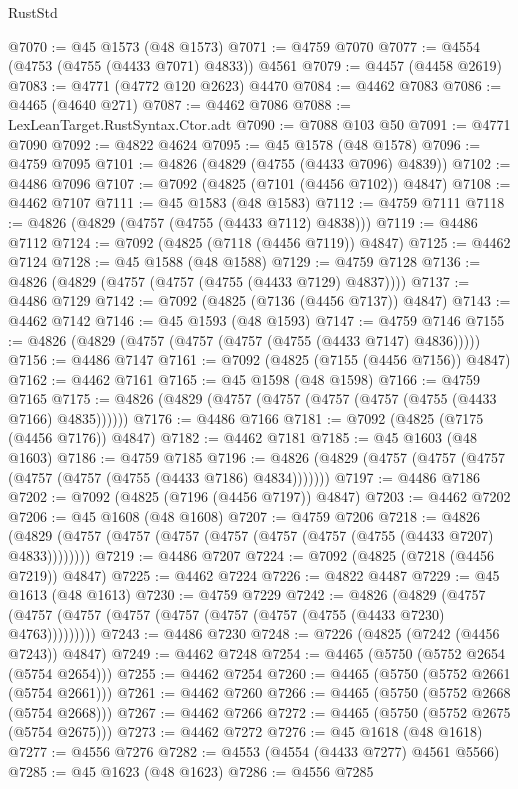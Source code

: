 \begin{lexlean}{RustStd}
\begin{coremodule}
@7070 := @45 @1573 (@48 @1573)
@7071 := @4759 @7070
@7077 := @4554 (@4753 (@4755 (@4433 @7071) @4833)) @4561
@7079 := @4457 (@4458 @2619)
@7083 := @4771 (@4772 @120 @2623) @4470
@7084 := @4462 @7083
@7086 := @4465 (@4640 @271)
@7087 := @4462 @7086
@7088 := LexLeanTarget.RustSyntax.Ctor.adt
@7090 := @7088 @103 @50
@7091 := @4771 @7090
@7092 := @4822 @4624
@7095 := @45 @1578 (@48 @1578)
@7096 := @4759 @7095
@7101 := @4826 (@4829 (@4755 (@4433 @7096) @4839))
@7102 := @4486 @7096
@7107 := @7092 (@4825 (@7101 (@4456 @7102)) @4847)
@7108 := @4462 @7107
@7111 := @45 @1583 (@48 @1583)
@7112 := @4759 @7111
@7118 := @4826 (@4829 (@4757 (@4755 (@4433 @7112) @4838)))
@7119 := @4486 @7112
@7124 := @7092 (@4825 (@7118 (@4456 @7119)) @4847)
@7125 := @4462 @7124
@7128 := @45 @1588 (@48 @1588)
@7129 := @4759 @7128
@7136 := @4826 (@4829 (@4757 (@4757 (@4755 (@4433 @7129) @4837))))
@7137 := @4486 @7129
@7142 := @7092 (@4825 (@7136 (@4456 @7137)) @4847)
@7143 := @4462 @7142
@7146 := @45 @1593 (@48 @1593)
@7147 := @4759 @7146
@7155 := @4826 (@4829 (@4757 (@4757 (@4757 (@4755 (@4433 @7147) @4836)))))
@7156 := @4486 @7147
@7161 := @7092 (@4825 (@7155 (@4456 @7156)) @4847)
@7162 := @4462 @7161
@7165 := @45 @1598 (@48 @1598)
@7166 := @4759 @7165
@7175 := @4826 (@4829 (@4757 (@4757 (@4757 (@4757 (@4755 (@4433 @7166) @4835))))))
@7176 := @4486 @7166
@7181 := @7092 (@4825 (@7175 (@4456 @7176)) @4847)
@7182 := @4462 @7181
@7185 := @45 @1603 (@48 @1603)
@7186 := @4759 @7185
@7196 := @4826 (@4829 (@4757 (@4757 (@4757 (@4757 (@4757 (@4755 (@4433 @7186) @4834)))))))
@7197 := @4486 @7186
@7202 := @7092 (@4825 (@7196 (@4456 @7197)) @4847)
@7203 := @4462 @7202
@7206 := @45 @1608 (@48 @1608)
@7207 := @4759 @7206
@7218 := @4826 (@4829 (@4757 (@4757 (@4757 (@4757 (@4757 (@4757 (@4755 (@4433 @7207) @4833))))))))
@7219 := @4486 @7207
@7224 := @7092 (@4825 (@7218 (@4456 @7219)) @4847)
@7225 := @4462 @7224
@7226 := @4822 @4487
@7229 := @45 @1613 (@48 @1613)
@7230 := @4759 @7229
@7242 := @4826
    (@4829 (@4757 (@4757 (@4757 (@4757 (@4757 (@4757 (@4757 (@4755 (@4433 @7230) @4763)))))))))
@7243 := @4486 @7230
@7248 := @7226 (@4825 (@7242 (@4456 @7243)) @4847)
@7249 := @4462 @7248
@7254 := @4465 (@5750 (@5752 @2654 (@5754 @2654)))
@7255 := @4462 @7254
@7260 := @4465 (@5750 (@5752 @2661 (@5754 @2661)))
@7261 := @4462 @7260
@7266 := @4465 (@5750 (@5752 @2668 (@5754 @2668)))
@7267 := @4462 @7266
@7272 := @4465 (@5750 (@5752 @2675 (@5754 @2675)))
@7273 := @4462 @7272
@7276 := @45 @1618 (@48 @1618)
@7277 := @4556 @7276
@7282 := @4553 (@4554 (@4433 @7277) @4561 @5566)
@7285 := @45 @1623 (@48 @1623)
@7286 := @4556 @7285

\end{coremodule}
\end{lexlean}
